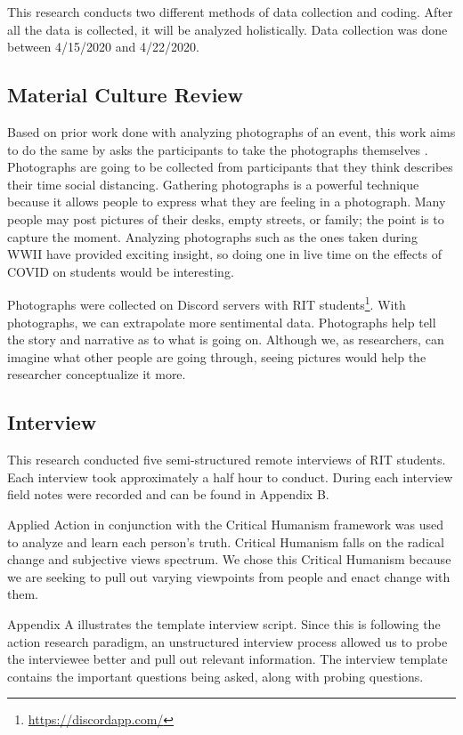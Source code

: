\documentclass[12pt,
 reprint,
nofootinbib,
 amsmath,amssymb,
 aps,
]{revtex4-2}
\begin{document}
This research conducts two different methods of data collection and coding. After all the data is collected, it will be analyzed holistically. Data collection was done between 4/15/2020 and 4/22/2020. 

\subsection{Material Culture Review}

Based on prior work done with analyzing photographs of an event, this work aims to do the same by asks the participants to take the photographs themselves \cite{photographyMaterialCulture}. 
Photographs are going to be collected from participants that they think describes their time social distancing. Gathering photographs is a powerful technique because it allows people to express what they are feeling in a photograph. Many people may post pictures of their desks, empty streets, or family; the point is to capture the moment.
Analyzing photographs such as the ones taken during WWII\cite{wwII} have provided exciting insight, so doing one in live time on the effects of COVID on students would be interesting. 

Photographs were collected on Discord servers with RIT students\footnote{\url{https://discordapp.com/}}. With photographs, we can extrapolate more sentimental data. Photographs help tell the story and narrative as to what is going on. Although we, as researchers, can imagine what other people are going through, seeing pictures would help the researcher conceptualize it more.

\subsection{Interview}

This research conducted five semi-structured remote interviews of RIT students.
Each interview took approximately a half hour to conduct. During each interview field notes were recorded and can be found in Appendix B. 

Applied Action in conjunction with the Critical Humanism framework was used to analyze and learn each person's truth. 
Critical Humanism falls on the radical change and subjective views spectrum. 
We chose this Critical Humanism because we are seeking to pull out varying viewpoints from people and enact change with them.

Appendix A illustrates the template interview script.
Since this is following the action research paradigm, an unstructured interview process allowed us to probe the interviewee better and pull out relevant information.
The interview template contains the important questions being asked, along with probing questions.
\end{document}
